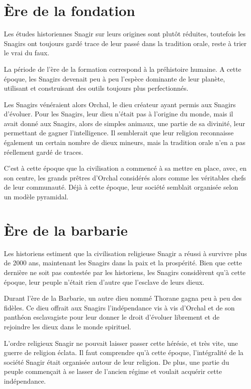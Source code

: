 \begin{multicols}{2}

\section{Ère de la fondation}

Les études historiennes Snagir sur leurs origines sont plutôt réduites, toutefois les Snagirs ont toujours gardé trace de leur passé dans la tradition orale, reste à trier le vrai du faux.

La période de l’ère de la formation correspond à la préhistoire humaine. A cette époque, les Snagirs devenait peu à peu l’espèce dominante de leur planète, utilisant et construisant des outils toujours plus perfectionnés.

Les Snagirs vénéraient alors Orchal, le dieu créateur ayant permis aux Snagirs d’évoluer. Pour les Snagirs, leur dieu n’était pas à l’origine du monde, mais il avait donné aux Snagirs, alors de simples animaux, une partie de sa divinité, leur permettant de gagner l’intelligence. Il semblerait que leur religion reconnaisse également un certain nombre de dieux mineurs, mais la tradition orale n’en a pas réellement gardé de traces.

C’est à cette époque que la civilisation a commencé à sa mettre en place, avec, en son centre, les grands prêtres d’Orchal considérés alors comme les véritables chefs de leur communauté. Déjà à cette époque, leur société semblait organisée selon un modèle pyramidal.

\section{Ère de la barbarie}

Les historiens estiment que la civilisation religieuse Snagir a réussi à survivre plus de 2000 ans, maintenant les Snagirs dans la paix et la prospérité. Bien que cette dernière ne soit pas contestée par les historiens, les Snagirs considèrent qu'à cette époque, leur peuple n’était rien d’autre que l'esclave de leurs dieux. 

Durant l’ère de la Barbarie, un autre dieu nommé Thorane gagna peu à peu des fidèles. Ce dieu offrait aux Snagirs l’indépendance vis à vis d’Orchal et de son panthéon esclavagiste pour leur donner le droit d’évoluer librement et de rejoindre les dieux dans le monde spirituel.

L’ordre religieux Snagir ne pouvait laisser passer cette hérésie, et très vite, une guerre de religion éclata. Il faut comprendre qu’à cette époque, l’intégralité de la société Snagir était organisée autour de leur religion.  De plus, une partie du peuple commençait à se lasser de l’ancien régime et voulait acquérir cette indépendance.


\end{multicols}
